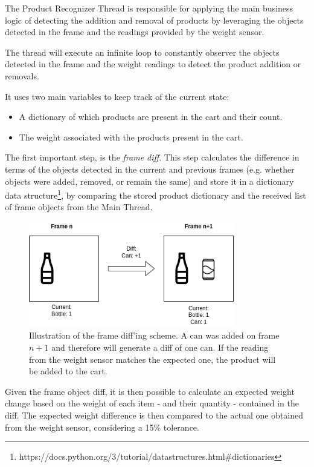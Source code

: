 \documentclass[openright]{normas-utf-tex} %
\begin{document}
The Product Recognizer Thread is responsible for applying the main business
logic of detecting the addition and removal of products by leveraging the
objects detected in the frame and the readings provided by the weight sensor.

The thread will execute an infinite loop to constantly observer the objects
detected in the frame and the weight readings to detect the product addition
or removals.

It uses two main variables to keep track of the current state:
\begin{itemize}
    \item A dictionary of which products are present in the cart and their count.
    \item The weight associated with the products present in the cart.
\end{itemize}

The first important step, is the \textit{frame diff}. This step 
calculates the difference in terms of the objects detected in the current 
and previous frames (e.g. whether objects were added, removed, or remain the same) 
and store it in a dictionary data structure\footnote{https://docs.python.org/3/tutorial/datastructures.html\#dictionaries},
by comparing the stored product dictionary and the received list of frame
objects from the Main Thread.

\begin{figure}[H]
	\centering
	\includegraphics[width=0.8\textwidth]{./images/diagrams/framediff.png}
	\caption[Illustration of the frame diff'ing scheme]{Illustration of the frame diff'ing scheme. A can was added on frame $n+1$ and therefore will generate a diff of one can. If the reading from the weight sensor matches the expected one, the product will be added to the cart.}
    \label{fig:diff}
\end{figure}

Given the frame object diff, it is then possible to calculate an expected
weight change based on the weight of each item - and their quantity - contained
in the diff. The expected weight difference is then compared to the actual
one obtained from the weight sensor, considering a 15\% tolerance.
\end{document}

